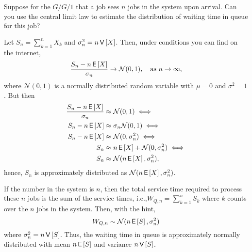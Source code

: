 \begin{exercise}
  Suppose for the $G/G/1$ that a job sees $n$ jobs in the system upon
  arrival. Can you use the central limit law to estimate the
  distribution of waiting time in queue for this job?  
  \begin{hint}
 Let $S_n = \sum_{k=1}^n X_k$ and $\sigma_n^2 = n\,\mathsf{V}\left[X\right]$. Then,
    under conditions you can find on the internet,
    \begin{equation*}
    \frac{S_n - n \,\mathsf{E}\left[X\right]}{\sigma_n} \to \mathcal{N}(0,1), \quad\text{as } n\to \infty,
    \end{equation*}
    where $\mathcal{N}(0,1)$ is a normally distributed random variable
    with $\mu=0$ and $\sigma^2=1$. But then 
    \begin{align*}
    \frac{S_n - n \,\mathsf{E}\left[X\right]}{\sigma_n} &\approx  \mathcal{N}(0,1)  \iff\\
    S_n - n \,\mathsf{E}\left[X\right] &\approx  \sigma_n \mathcal{N}(0,1)  \iff\\
    S_n - n \,\mathsf{E}\left[X\right] &\approx  \mathcal{N}(0,\sigma_n^2)  \iff\\
    S_n  &\approx   n \,\mathsf{E}\left[X\right] + \mathcal{N}(0,\sigma_n^2)  \iff\\
    S_n  &\approx    \mathcal{N}(n \,\mathsf{E}\left[X\right],\sigma_n^2),
    \end{align*}
    hence, $S_n$ is approximately distributed as
    $\mathcal{N}(n\,\mathsf{E}\left[X\right], \sigma_n^2)$.
  \end{hint}
\begin{solution} If the number in the system is $n$, then the total
  service time required to process these $n$ jobs is the sum of the
  service times, i.e.,$W_{Q,n} = \sum_{k=1}^n S_k$ where $k$ counts over the
  $n$ jobs in the system. Then, with the hint,
  \begin{equation*}
    W_{Q, n} \sim  \mathcal{N}(n\,\mathsf{E}\left[S\right], \sigma_n^2)
  \end{equation*}
where $\sigma_n^2 = n \,\mathsf{V}\left[S\right]$. 
Thus, the waiting time in queue is approximately normally distributed with mean $n \,\mathsf{E}\left[S\right]$ and variance $n \,\mathsf{V}\left[S\right]$. 
\end{solution}
\end{exercise}

